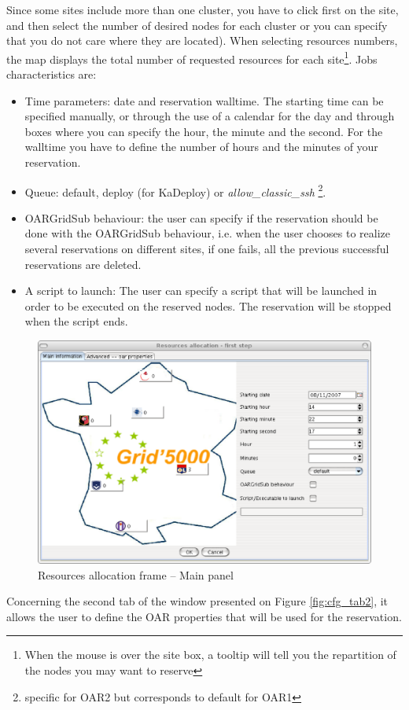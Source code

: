 Since some sites include more than one cluster, you have to click first on the
site, and then select the number of desired nodes for each cluster or you can
specify that you do not care where they are located).
When selecting resources numbers, the map displays the total number of requested
resources for each site\footnote{When the mouse is over the site box, a tooltip
will tell you the repartition of the nodes you may want to reserve}. Jobs characteristics
are:
\begin{itemize}
  \item Time parameters: date and reservation walltime. The starting time can
  be specified manually, or through the use of a calendar for the day and
  through boxes where you can specify the hour, the minute and the second. For
  the walltime you have to define the number of hours and the minutes of your reservation.
  \item Queue: default, deploy (for KaDeploy) or \textit{allow\_classic\_ssh}
  \footnote{specific for OAR2 but corresponds to default for OAR1}.
  \item OARGridSub behaviour: the user can specify if the reservation should be
  done with the OARGridSub behaviour, i.e. when the user chooses to realize
  several reservations on different sites, if one fails, all the previous
  successful reservations are deleted.
  \item A script to launch: The user can specify a script that will be launched
  in order to be executed on the reserved nodes. The reservation will be stopped
  when the script ends.
\end{itemize}

\begin{figure}[H]
\centering
\includegraphics[width=0.6\linewidth]{figures/GRUDU_allocation_1.eps}
\caption{Resources allocation frame -- Main panel}
\label{fig:cfg_allocation1}
\end{figure}

Concerning the second tab of the window presented on Figure \ref{fig:cfg_tab2},
it allows the user to define the OAR properties that will be used for
 the reservation.
 
